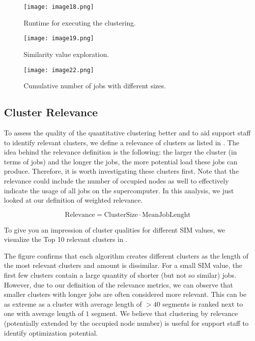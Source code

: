 \documentclass{jhps}
\begin{document}
\begin{figure}
  \centering
  \texttt{[image: image18.png]}
  \caption{Runtime for executing the clustering.}
  \label{fig:alg_runtimes}
\end{figure}


\begin{figure}
  \centering
  \texttt{[image: image19.png]}
  \caption{Similarity value exploration.}
  \label{fig:sim_exploration}
\end{figure}

\begin{figure}
  \centering
  \texttt{[image: image22.png]}
  \caption{Cumulative number of jobs with different sizes.}
  \label{fig:cum_num_job_sizes}
\end{figure}

\subsection{Cluster Relevance}

To assess the quality of the quantitative clustering better and to aid support staff to identify relevant clusters, we define a relevance of clusters as listed in .
The idea behind the relevance definition is the following: the larger the cluster (in terms of jobs) and the longer the jobs, the more potential load these jobs can produce.
Therefore, it is worth investigating these clusters first.
Note that the relevance could include the number of occupied nodes as well to effectively indicate the usage of all jobs on the supercomputer.
In this analysis, we just looked at our definition of weighted relevance.

\begin{equation}
\text{Relevance} = \text{ClusterSize} \cdot \text{MeanJobLenght}
\label{eq:rel}
\end{equation}

To give you an impression of cluster qualities for different SIM values, we visualize the Top 10 relevant clusters in .

The figure confirms that each algorithm creates different clusters as the length of the most relevant clusters and amount is dissimilar.
For a small SIM value, the first few clusters contain a large quantity of shorter (but not so similar) jobs.
However, due to our definition of the relevance metrics, we can observe that smaller clusters with longer jobs are often considered more relevant.
This can be as extreme as a cluster with average length of $>40$ segments is ranked next to one with average length of $1$ segment.
We believe that clustering by relevance (potentially extended by the occupied node number) is useful for support staff to identify optimization potential.
\end{document}
